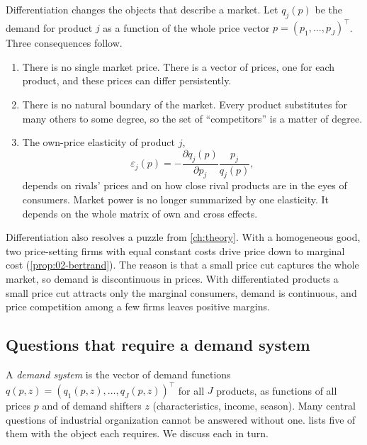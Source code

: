 Differentiation changes the objects that describe a market. Let $q_j(p)$ be the demand for product $j$ as a
function of the whole price vector $p = (p_1, \dots, p_J)^\top$. Three consequences follow.
\begin{enumerate}[label=(\roman*)]
  \item There is no single market price. There is a vector of prices, one for each product, and these prices can
  differ persistently.
  \item There is no natural boundary of the market. Every product substitutes for many others to some degree, so
  the set of ``competitors'' is a matter of degree.
  \item The own-price elasticity of product $j$,
  \begin{equation*}
  \varepsilon_j(p) = -\frac{\partial q_j(p)}{\partial p_j}\frac{p_j}{q_j(p)},
  \end{equation*}
  depends on rivals' prices and on how close rival products are in the eyes of consumers. Market power is no
  longer summarized by one elasticity. It depends on the whole matrix of own and cross effects.
\end{enumerate}
Differentiation also resolves a puzzle from \cref{ch:theory}. With a homogeneous good, two price-setting firms
with equal constant costs drive price down to marginal cost (\cref{prop:02-bertrand}). The reason is that a
small price cut captures the whole market, so demand is discontinuous in prices. With differentiated products a
small price cut attracts only the marginal consumers, demand is continuous, and price competition among a few
firms leaves positive margins.

\subsection{Questions that require a demand system}\label{sec:04-why-questions}

A \emph{demand system} is the vector of demand functions $q(p, z) = (q_1(p, z), \dots, q_J(p, z))^\top$ for all
$J$ products, as functions of all prices $p$ and of demand shifters $z$ (characteristics, income, season). Many
central questions of industrial organization cannot be answered without one.  lists five
of them with the object each requires. We discuss each in turn.

